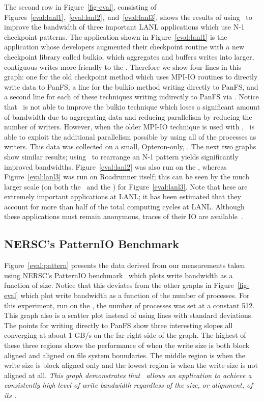 The second row in Figure~\ref{fig-eval}, consisting of
Figures~\ref{eval:lanl1},~\ref{eval:lanl2},~and~\ref{eval:lanl3}, shows the
results of using \plfs\ to improve the bandwidth of three important LANL
applications which use N-1 checkpoint patterns. The application
shown in Figure~\ref{eval:lanl1} is the application whose developers augmented
their checkpoint routine with a new checkpoint library called bulkio, which
aggregates and buffers writes into larger, contiguous writes more friendly to
the \upfs. Therefore we show four lines in this graph: one for the old
checkpoint method which uses MPI-IO routines to directly write data to PanFS, a
line for the bulkio method writing directly to PanFS, and a second line for
each of these techniques writing indirectly to PanFS via \plfs. Notice that
\plfs\ is not able to improve the bulkio technique which loses a significant
amount of bandwidth due to aggregating data and reducing parallelism by
reducing the number of writers. However, when the older MPI-IO technique is
used with \plfs, \plfs\ is able to exploit the additional parallelism possible
by using all of the processes as writers. This data was collected on a small,
Opteron-only, \rrz. The next two graphs show similar results; using \plfs\ to
rearrange an N-1 pattern yields significantly improved bandwidths.
Figure~\ref{eval:lanl2} was also run on the \rrz, whereas
Figure~\ref{eval:lanl3} was run on Roadrunner itself; this can be seen by the
much larger scale (on both the \yaxis\ and the \xaxis) for
Figure~\ref{eval:lanl3}. Note that hese are extremely important applications
at LANL; it has been estimated that they account for more than half of the
total computing cycles at LANL. Although these applications must remain
anonymous, traces of their IO are available~\cite{plfs-maps}.

\subsection{NERSC's PatternIO Benchmark}

Figure~\ref{eval:pattern} presents the data derived from our measurements taken
using NERSC's PatternIO benchmark~\cite{nersc} which plots write bandwidth as a
function of  size. Notice that this deviates from the other
graphs in Figure~\ref{fig-eval} which plot write bandwidth as a function of the
number of processes. For this experiment, run on the \rrz, the number of
processes was set at a constant 512. This graph also is a scatter plot instead
of using lines with standard deviations. The points for writing directly to
PanFS show three interesting slopes all converging at about 1 GB/s on the far
right side of the graph. The highest of these three regions shows the
performance of  when the write size is both block aligned and
aligned on file system boundaries. The middle region is when the write size is
block aligned only and the lowest region is when the write size is not aligned
at all. {\em This graph demonstrates that \plfs\ allows an application to
achieve a consistently high level of write bandwidth regardless of the size, or
alignment, of its .}

